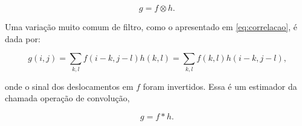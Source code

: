 \begin{equation}
  \label{eq:correlacao_compac}
  g=f\otimes h\text{.}
\end{equation}

Uma variação muito comum de filtro, como o apresentado em \eqref{eq:correlacao}, é dada por:

\begin{equation}
  \label{eq:convolucao}
  g(i,j)=\sum_{k,l}f(i-k,j-l)h(k,l)=\sum_{k,l}f(k,l)h(i-k,j-l)\text{,}
\end{equation}

\noindent onde o sinal dos deslocamentos em $f$ foram invertidos. Essa é um estimador da chamada operação de convolução,

\begin{equation}
  \label{eq:convolucao_compac}
  g=f*h\text{.}
\end{equation}


